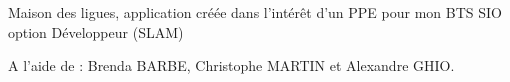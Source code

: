 Maison des ligues, application créée dans l'intérêt d'un P\+P\+E pour mon B\+T\+S S\+I\+O option Développeur (S\+L\+A\+M)

A l'aide de \+: Brenda B\+A\+R\+B\+E, Christophe M\+A\+R\+T\+I\+N et Alexandre G\+H\+I\+O. 